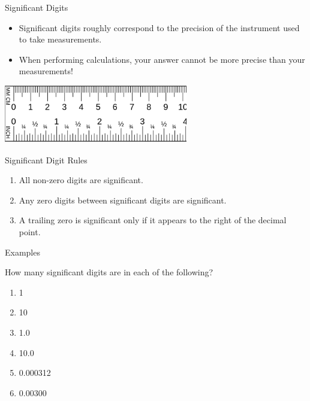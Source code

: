 \documentclass{beamer}
\begin{document}
\begin{frame}{Significant Digits}
\begin{itemize}[<+(1)->]
    \item Significant digits roughly correspond to the precision of the instrument used to take measurements. 
    \item When performing calculations, your answer cannot be more precise than your measurements!
\end{itemize}

\includegraphics[height=1in]{../lectures/images/ruler-4-1875in}
\end{frame}

\begin{frame}{Significant Digit Rules}
\begin{enumerate}[<+->]
    \item All non-zero digits are significant.
    \item Any zero digits between significant digits are significant.
    \item A trailing zero is significant only if it appears to the right of the decimal point.
\end{enumerate}
\end{frame}

\begin{frame}{Examples}

How many significant digits are in each of the following?\newline
\begin{enumerate}
    \item<1-> 1 
    \item<3-> 10 
    \item<5-> 1.0 
    \item<7-> 10.0 
    \item<9-> 0.000312 
    \item<11-> 0.00300 
\end{enumerate}
\end{frame}
\end{document}
